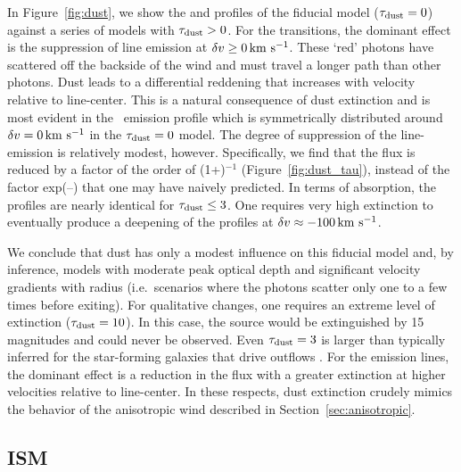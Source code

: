 \documentclass[12pt,preprint]{aastex}
\begin{document}
In Figure~\ref{fig:dust}, we show the  and 
profiles of the fiducial model ($\tau_{\rm dust} = 0$) against a series of
models with $\tau_{\rm dust} > 0$.  For the  transitions, the
dominant effect is the suppression of line emission at $\delta v \ge 0
\, {\rm km~s^{-1}}$.  These `red' photons have scattered off the
backside of the wind and must travel a longer path than other
photons.  Dust leads to a differential reddening that increases with 
velocity relative to line-center. This is a natural consequence of dust
extinction and is most evident in the \feiic\ 
emission profile which is symmetrically distributed around
$\delta v= 0 \, {\rm km~s^{-1}}$ in the $\tau_{\rm dust}=0$ model.   
The degree of suppression of the line-emission is relatively modest,
however.  Specifically, we find that the flux is reduced by a factor 
of the order of (1+\taud)$^{-1}$ (Figure~\ref{fig:dust_tau}),
instead of the factor
exp(--\taud) that one may have naively predicted. 
In terms of absorption, the profiles are
nearly identical for $\tau_{\rm dust} \le 3$.  One requires very high
extinction to eventually produce a deepening of the profiles at 
$\delta v \approx -100 \, {\rm km~s^{-1}}$.

We conclude that dust has only a modest influence on this fiducial model and,
by inference, models with moderate peak optical depth and
significant velocity gradients with radius (i.e.\ scenarios where the
photons scatter only one to a few times before exiting).
For qualitative changes, one requires an extreme level of
extinction ($\tau_{\rm dust} = 10$).  In this case, the source would be
extinguished by 15\,magnitudes and could never be observed. 
Even $\tau_{\rm dust} = 3$ is larger than typically inferred for the
star-forming galaxies that drive outflows \citep[e.g.][]{cf00}.
For the emission lines,
the dominant effect is a reduction in the flux 
with a greater extinction at higher velocities relative to line-center.
In these respects, dust extinction crudely mimics the behavior of the
anisotropic
wind described in Section~\ref{sec:anisotropic}. 


\subsection{ISM}
\label{sec:ISM}
\end{document}
